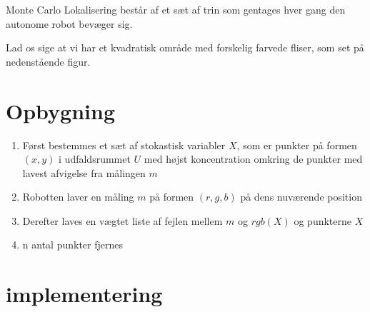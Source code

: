 \documentclass[../../SRP.tex]{subfiles}
\begin{document}
Monte Carlo Lokalisering består af et sæt af trin som gentages hver gang den autonome robot bevæger sig. 

Lad os sige at vi har et kvadratisk område med forskelig farvede fliser, som set på nedenstående figur. \\

\section{Opbygning}

\begin{enumerate}
  \item Først bestemmes et sæt af stokastisk variabler $X$, som er punkter på formen $(x,y)$ i udfaldsrummet $U$ med højst koncentration omkring de punkter med lavest afvigelse fra målingen $m$

  \item Robotten laver en måling $m$ på formen $(r,g,b)$ på dens nuværende position

  \item Derefter laves en vægtet liste af fejlen mellem $m$ og $rgb(X)$ og punkterne $X$

  \item n antal punkter fjernes
\end{enumerate}

\section{implementering}
\end{document}

